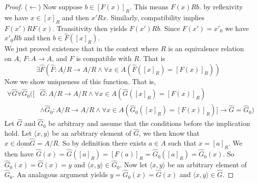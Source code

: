 \documentclass{report}
\begin{document}
\begin{proof}
\indent($\leftarrow$) Now suppose $b\in[F(x)]_R$. This means $F(x)Rb$. by reflexivity we have $x\in[x]_R$ and then $x'Rx$. Similarly, compatibility implies $F(x')RF(x)$. Transitivity then yields
$F(x')Rb$. Since $F(x')=x'_0$ we have $x'_0Rb$ and then $b\in\hat F([x]_R)$.\\
\indent We just proved existence that in the context where $R$ is an equivalence relation on $A$, $F:A\to A$, and $F$ is compatible with $R$. That is
\begin{equation*}
\exists\hat F(\hat F:A/R\to A/R\land\forall x\in A(\hat F([x]_R)=[F(x)]_R))
\end{equation*}
Now we show uniqueness of this function. That is,
\begin{align*}
\forall\hat G\forall\hat G_0([&\hat G:A/R\to A/R\land\forall x\in A(\hat G([x]_R)=[F(x)]_R)\\
&\land\hat G_0:A/R\to A/R\land\forall x\in A(\hat G_0([x]_R)=[F(x)]_R)]\to \hat G=\hat G_0)
\end{align*}
Let $\hat G$ and $\hat G_0$ be arbitrary and assume that the conditions before the implication hold. Let $\langle x,y\rangle$ be an arbitrary element of $\hat G$, we then know that 
$x\in\text{dom}\hat G=A/R$. So by definition there exists $a\in A$ such that $x=[a]_R$.
We then have $\hat G(x)=\hat G([a]_R)=[F(a)]_R=\hat G_0([a]_R)=\hat G_0(x)$. So $\hat G_0(x)=\hat G(x)=y$ and $\langle x,y\rangle\in\hat G_0$. 
Now let $\langle x,y\rangle$ be an arbitrary element of $\hat G_0$. An analagous argument yields $y=\hat G_0(x)=\hat G(x)$ and $\langle x,y\rangle\in\hat G$.
\end{proof}
\newpage
\end{document}
